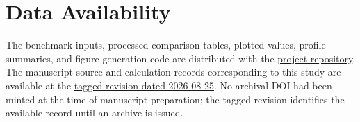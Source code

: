     \section*{Data Availability}
The benchmark inputs, processed comparison tables, plotted values, profile summaries, and figure-generation code are distributed with the \href{https://github.com/tannerpolley/MEA-Absorption-Column}{project repository}. The manuscript source and calculation records corresponding to this study are available at the \href{https://github.com/tannerpolley/MEA-Absorption-Column/tree/nce-mea-only-pre-mdea-2026-08-25}{tagged revision dated 2026-08-25}. No archival DOI had been minted at the time of manuscript preparation; the tagged revision identifies the available record until an archive is issued.
